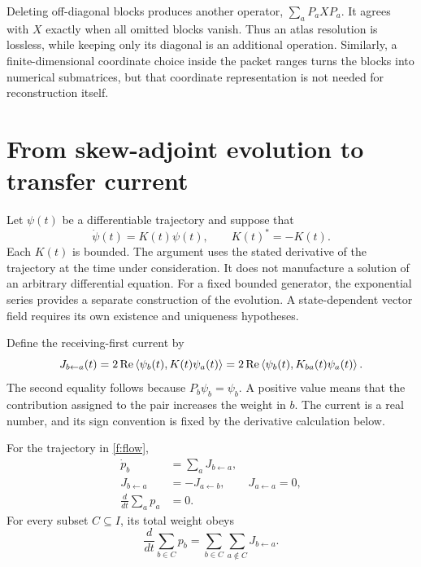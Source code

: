 Deleting off-diagonal blocks produces another operator, $\sum_aP_aXP_a$. It agrees with $X$ exactly when all omitted blocks vanish. Thus an atlas resolution is lossless, while keeping only its diagonal is an additional operation. Similarly, a finite-dimensional coordinate choice inside the packet ranges turns the blocks into numerical submatrices, but that coordinate representation is not needed for reconstruction itself.



\section{From skew-adjoint evolution to transfer current}\label{f:transfer}

Let $\psi(t)$ be a differentiable trajectory and suppose that
\begin{equation}\label{f:flow}
 \dot\psi(t)=K(t)\psi(t),\qquad K(t)^*=-K(t).
\end{equation}
Each $K(t)$ is bounded. The argument uses the stated derivative of the trajectory at the time under consideration. It does not manufacture a solution of an arbitrary differential equation. For a fixed bounded generator, the exponential series provides a separate construction of the evolution. A state-dependent vector field requires its own existence and uniqueness hypotheses.

Define the receiving-first current by
\begin{equation}\label{f:current}
 J_{b\leftarrow a}(t)
 =2\operatorname{Re}\left\langle\psi_b(t),K(t)\psi_a(t)\right\rangle
 =2\operatorname{Re}\left\langle\psi_b(t),K_{ba}(t)\psi_a(t)\right\rangle.
\end{equation}
The second equality follows because $P_b\psi_b=\psi_b$. A positive value means that the contribution assigned to the pair increases the weight in $b$. The current is a real number, and its sign convention is fixed by the derivative calculation below.

\begin{theorem}\label{f:transfer-theorem}
For the trajectory in \eqref{f:flow},
\begin{align}
 \dot p_b&=\sum_aJ_{b\leftarrow a},\label{f:continuity}\\
 J_{b\leftarrow a}&=-J_{a\leftarrow b},\qquad
 J_{a\leftarrow a}=0,\label{f:antisymmetry}\\
 \frac{d}{dt}\sum_ap_a&=0.
\end{align}
For every subset $C\subseteq I$, its total weight obeys
\begin{equation}\label{f:boundary-current}
 \frac{d}{dt}\sum_{b\in C}p_b
 =\sum_{b\in C}\sum_{a\notin C}J_{b\leftarrow a}.
\end{equation}
\end{theorem}

